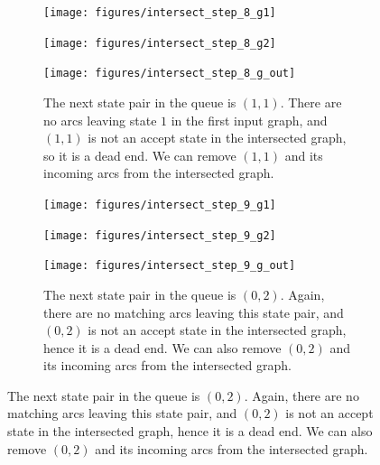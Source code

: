 \begin{figure}
    \begin{subfigure}{\linewidth}
        \begin{minipage}{0.22\textwidth}
            \centering
            \texttt{[image: figures/intersect\_step\_8\_g1]}
        \end{minipage}
        \begin{minipage}{0.37\textwidth}
            \centering
            \texttt{[image: figures/intersect\_step\_8\_g2]}
        \end{minipage}
        \begin{minipage}{0.37\textwidth}
            \centering
            \texttt{[image: figures/intersect\_step\_8\_g\_out]}
        \end{minipage}
        \caption{The next state pair in the queue is $(1, 1)$. There are no
        arcs leaving state $1$ in the first input graph, and $(1, 1)$ is not an
        accept state in the intersected graph, so it is a dead end. We can
        remove $(1, 1)$ and its incoming arcs from the intersected graph.}
    \end{subfigure}

    \begin{subfigure}{\linewidth}
        \begin{minipage}{0.22\textwidth}
            \centering
            \texttt{[image: figures/intersect\_step\_9\_g1]}
        \end{minipage}
        \begin{minipage}{0.37\textwidth}
            \centering
            \texttt{[image: figures/intersect\_step\_9\_g2]}
        \end{minipage}
        \begin{minipage}{0.37\textwidth}
            \centering
            \texttt{[image: figures/intersect\_step\_9\_g\_out]}
        \end{minipage}
        \caption{The next state pair in the queue is $(0, 2)$. Again, there are
        no matching arcs leaving this state pair, and $(0, 2)$ is not an accept
        state in the intersected graph, hence it is a dead end. We can also
        remove $(0, 2)$ and its incoming arcs from the intersected graph.}
    \end{subfigure}
\end{figure}

